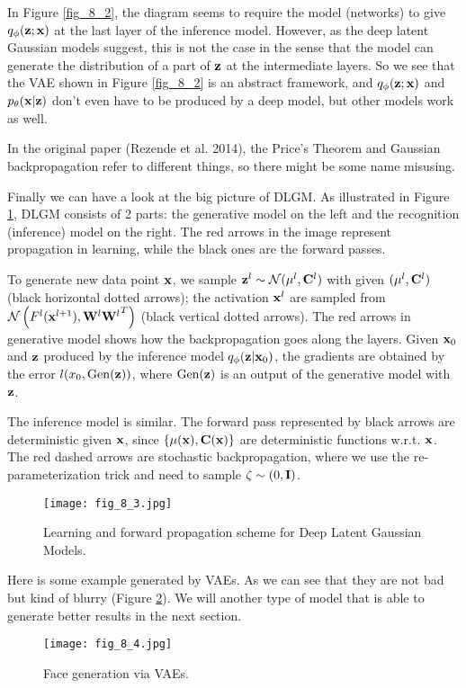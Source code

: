 \documentclass[../book-template.tex]{subfiles}
\begin{document}
\begin{remark}\label{rmk_8_1}
	In Figure \ref{fig_8_2}, the diagram seems to require the model (networks) to give $q_\phi({\bf z};{\bf x})$  at the last layer of the inference model. However, as the deep latent Gaussian models suggest, this is not the case in the sense that the model can generate the distribution of a part of ${\bf z}$ at the intermediate layers. So we see that the VAE shown in Figure \ref{fig_8_2} is an abstract framework, and $q_\phi({\bf z};{\bf x})$ and $p_\theta({\bf x}|{\bf z})$ don't even have to be produced by a deep model, but other models work as well.
\end{remark}
\begin{remark}
In the original paper (Rezende et al. 2014), the Price's Theorem and Gaussian backpropagation refer to different things, so there might be some name misusing.
\end{remark}
Finally we can have a look at the big picture of DLGM. As illustrated in Figure \ref{fig_8_3}, DLGM consists of 2 parts: the generative model on the left and the recognition (inference) model on the right. The red arrows in the image represent propagation in learning, while the black ones are the forward passes. 
\par To generate new data point ${\bf x}$, we sample ${\bf z}^l\sim \mathcal{N}(\mu^l,{\bf C}^l)$ with given $(\mu^l,{\bf C}^l)$ (black horizontal dotted arrows); the activation ${\bf x}^l$ are sampled from $ \mathcal{N}\left(F^l({\bf x}^{l+1}),{{\bf W}^l{\bf W}^l}^T\right)$ (black vertical dotted arrows). The red arrows in generative model shows how the backpropagation goes along the layers. Given ${\bf x}_0$ and ${\bf z}$ produced by the inference model $q_\phi({\bf z}|{\bf x}_0)$, the gradients are obtained by the error $l(x_0,{\rm Gen}({\bf z}))$, where ${\rm Gen}({\bf z})$ is an output of the generative model with ${\bf z}$.
\par The inference model is similar. The forward pass represented by black arrows are deterministic given ${\bf x}$, since $\{\mu({\bf x}), {\bf C}({\bf x})\}$ are deterministic functions w.r.t. ${\bf x}$. The red dashed arrows are stochastic backpropagation, where we use the re-parameterization trick and need to sample $\zeta\sim \mathcal(0,{\bf I})$.
\begin{figure}[h] 
	\centering 
	\texttt{[image: fig\_8\_3.jpg]} 
	\caption{Learning and forward propagation scheme for Deep Latent Gaussian Models.}\label{fig_8_3}
\end{figure}
\par Here is some example generated by VAEs. As we can see that they are not bad but kind of blurry (Figure \ref{fig_8_4}). We will another type of model that is able to generate better results in the next section.
\begin{figure}[h] 
	\centering 
	\texttt{[image: fig\_8\_4.jpg]} 
	\caption{Face generation via VAEs.}\label{fig_8_4}
\end{figure}
\end{document}

